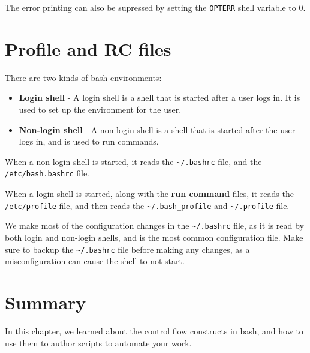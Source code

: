 The error printing can also be supressed by setting the \lstinline|OPTERR| shell variable to $0$.

\section{Profile and RC files}

There are two kinds of bash environments:

\begin{itemize}
  \item \textbf{Login shell} - A login shell is a shell that is started after a user logs in. It is used to set up the environment for the user.
  \item \textbf{Non-login shell} - A non-login shell is a shell that is started after the user logs in, and is used to run commands.
\end{itemize}

When a non-login shell is started, it reads the \lstinline|~/.bashrc| file, and the \lstinline|/etc/bash.bashrc| file.

When a login shell is started, along with the \textbf{run command} files, it reads the \lstinline|/etc/profile| file, and then reads the \lstinline|~/.bash_profile| and \lstinline|~/.profile| file.

We make most of the configuration changes in the \lstinline|~/.bashrc| file, as it is read by both login and non-login shells, and is the most common configuration file.
Make sure to backup the \lstinline|~/.bashrc| file before making any changes, as a misconfiguration can cause the shell to not start.

\newpage
\section{Summary}

In this chapter, we learned about the control flow constructs in bash, and how to use them to author scripts to automate your work.


